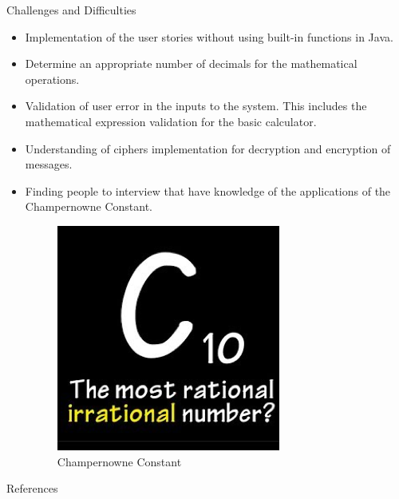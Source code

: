 \documentclass[final]{beamer}
\newlength{\onecolwid}
\begin{document}
\begin{frame}[t]
\begin{columns}[t]
\begin{column}{\onecolwid} %


\begin{block}{Challenges and Difficulties}

\begin{itemize}
\item Implementation of the user stories without using built-in functions in Java.\newline
\item Determine an appropriate number of decimals for the mathematical operations.\newline
\item Validation of user error in the inputs to the system. This includes the mathematical expression validation for the basic calculator.\newline
\item Understanding of ciphers implementation for decryption and encryption of messages.\newline
\item Finding people to interview that have knowledge of the applications of the Champernowne Constant. \newline

\begin{figure}
\includegraphics[width=0.3\linewidth]{images/champ.png}
\caption{Champernowne Constant}
\end{figure}

\end{itemize}
\end{block}

\begin{block}{References}

\nocite{*} %
\small{
\vspace{0.75in}}


\end{block}
\end{column}
\end{columns}
\end{frame}
\end{document}
